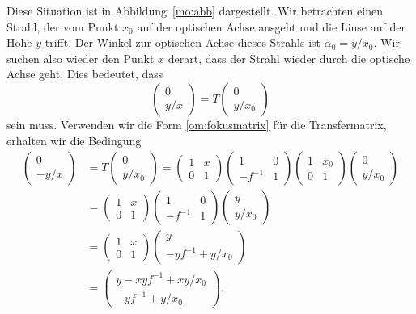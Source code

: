 Diese Situation ist in Abbildung~\ref{mo:abb} dargestellt.
Wir betrachten einen Strahl, der vom Punkt $x_0$ 
auf der optischen Achse ausgeht und die Linse auf der Höhe $y$ 
trifft.
Der Winkel zur optischen Achse dieses Strahls ist $\alpha_0=y/x_0$.
Wir suchen also wieder den Punkt $x$ derart, dass der Strahl
wieder durch die optische Achse geht.
Dies bedeutet, dass
\[
\begin{pmatrix} 0\\ y/x \end{pmatrix}
=
T
\begin{pmatrix} 0\\ y/x_0 \end{pmatrix}
\]
sein muss.
Verwenden wir die Form \eqref{om:fokusmatrix} für die Transfermatrix,
erhalten wir die Bedingung
\begin{align*}
\begin{pmatrix}0\\-y/x\end{pmatrix}
&=
T
\begin{pmatrix}0\\ y/x_0\end{pmatrix}
=
\begin{pmatrix}1&x\\0&1\end{pmatrix}
\begin{pmatrix}1&0\\-f^{-1}&1\end{pmatrix}
\begin{pmatrix}1&x_0\\0&1\end{pmatrix}
\begin{pmatrix}0\\ y/x_0\end{pmatrix}
\\
&=
\begin{pmatrix}1&x\\0&1\end{pmatrix}
\begin{pmatrix}1&0\\-f^{-1}&1\end{pmatrix}
\begin{pmatrix}y\\y/x_0\end{pmatrix}
\\
&=
\begin{pmatrix}1&x\\0&1\end{pmatrix}
\begin{pmatrix}y\\ -yf^{-1}+y/x_0\end{pmatrix}
\\
&=
\begin{pmatrix} y-xyf^{-1}+xy/x_0\\ -yf^{-1}+y/x_0 \end{pmatrix}.
\end{align*}
